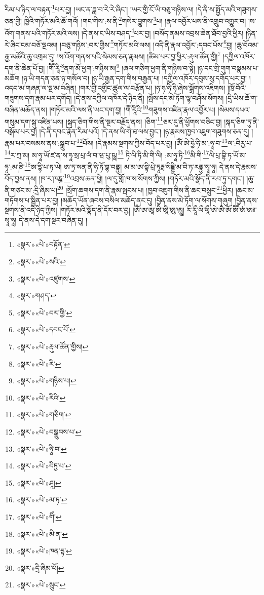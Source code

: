 རིམ་པ་ཉིད་ལ་བརྟན་\footnote{«སྣར་»«པེ་»བརྟོན་}པར་བྱ། །ཡང་ན་ཟླ་བ་རེ་རེ་ཞིང་། །ཡར་གྱི་ངོ་ཡི་བཅུ་གཉིས་ལ། །དེ་ནི་ས་སྤྱོད་མའི་གཟུགས་ཅན་གྱི། ཁྱིའི་གཏོར་མའི་ཆོ་གའོ། །གང་གིས་:ས་ནི་\footnote{«སྣར་»«པེ་»སའི་}གསེར་བྱུགས་\footnote{«སྣར་»«པེ་»འཛུགས་}པ། །རྣལ་འབྱོར་པས་ནི་འགྲུབ་འགྱུར་བ། །ས་འོག་གནས་པའི་གཏོར་མའི་ལས། །དེ་ནས་ང་ཡིས་བཤད་\footnote{«སྣར་»གཤད་}པར་བྱ། །བསོད་ནམས་འབྲས་ཆེན་ཐོབ་བྱའི་ཕྱིར། །ཉིན་རེ་ཞིང་ངམ་བཅོ་ལྔའམ། །བཅུ་གཉིས་:བར་གྱིས་\footnote{«སྣར་»«པེ་»བར་གྱི་}གཏོར་མའི་ལས། །འདི་ནི་རྣལ་འབྱོར་:དབང་པོས་\footnote{«སྣར་»«པེ་»དབང་པོ་}བྱ། །ཆུ་བོའམ་རྒྱ་མཚོའི་ཆུ་འགྲམ་དུ། །ས་འོག་གནས་པའི་སེམས་ཅན་རྣམས། །ཚིམ་པར་བྱ་ཕྱིར་:རྡུལ་ཚོན་གྱི།\footnote{«སྣར་»«པེ་»རྡུལ་ཚོན་གྱིས།} །དཀྱིལ་འཁོར་དག་ནི་ཆེན་པོ་བྱ། །གཽ་རཱི་\footnote{«སྣར་»«པེ་»རི་}ནག་མོ་ཕྱག་:གཉིས་མ།\footnote{«སྣར་»«པེ་»གཉིས་པ།} །ཞལ་གཅིག་ཕྱག་ནི་གཉིས་བ་སྟེ། །ཉ་དང་གྲི་གུག་བསྣམས་པ་མཆོག །ཉ་ཡི་གདན་ཅན་ཉ་གསོལ་བ། །ཉ་ཡི་རྒྱན་དག་གིས་བརྒྱན་པ། །དཀྱིལ་འཁོར་དབུས་སུ་དགོད་པར་བྱ། །འདབ་མ་གཞན་ལ་སྔ་མ་བཞིན། །གར་གྱི་འགྱིང་ཚུལ་ལ་བརྩོན་པ། །ཧ་ཧ་ཧི་ཧི་ཞེས་སྒྲོགས་འཇིགས། །ཁྲོ་བོའི་གཟུགས་དག་རྣམ་པར་དགོད། །དེ་ནས་དཀྱིལ་འཁོར་དེ་ཉིད་ནི། །སྤོས་དང་མེ་ཏོག་ལྷ་བཤོས་སོགས། །དྲི་ཡིས་ཆོ་ག་བཞིན་མཆོད་ནས། །གཏོར་མའི་ལས་ནི་ཡང་དག་བྱ། །གཽ་རཱིའི་\footnote{«སྣར་»«པེ་»རིའི་}གཟུགས་འཛིན་རྣལ་འབྱོར་པ། །སེམས་དཔའ་གསུམ་དག་སྐུ་འཛིན་པས། །སྐད་ཅིག་གིས་ནི་སྔར་བརྗོད་ནས། །ཅིག་\footnote{«སྣར་»«པེ་»གཅིག་}ཅར་དུ་ནི་ཕྱོགས་བཅིང་བྱ། །སྐད་ཅིག་ཏུ་ནི་བསྒོམ་པར་བྱ། །དེ་ནི་དབང་རྣོན་རིམ་པའོ། །དེ་ནས་ཡི་གེ་ཐ་ལས་བྱུང་། །ཉ་རྣམས་ཁྱབ་འཇུག་གཟུགས་ཅན་དུ། །རྣམ་པར་བསམས་ནས་:སྒྲུབ་པ་\footnote{«སྣར་»«པེ་»བསྒྲུབས་པ་}པོས། །དེ་རྣམས་སྔགས་ཀྱིས་བོད་པར་བྱ། །ཨོཾ་ཨེ་ཧྱེ་ཧི་མ་:ཧཱ་བ་\footnote{«སྣར་»«པེ་»ཧཱི་བ་}ལ་:བིརྱ་པ་\footnote{«སྣར་»«པེ་»བིཏྱ་པ་}ར་ཀྲ་མ། མ་ཧཱ་ཡོ་ཛ་ན་ས་ཧཱ་སྲ་པྲ་ལཾ་བ་ཝ་པུ་ཥཱ།\footnote{«སྣར་»«པེ་»ཤཱ།} ཏི་ལི་ཏི་མི་གི་ལི། :མ་ཧཱ་ཏི་\footnote{«སྣར་»«པེ་»མ་ཏ་}མི་གི་\footnote{«སྣར་»«པེ་»གིཾ་}ལི་པྲ་བྷི་ཏ་ཡོ་མ་ཧཱ་:མ་ཎི་\footnote{«སྣར་»«པེ་»མི་ན་}ཨ་དྷི་པ་ཏ་ཡེ། ཨ་ཏྲ་སན་ནི་ཧི་ཏོ་བྷ་བནྟུ། མ་མ་ཨ་བྷི་པྲེ་ཏཱརྠ་སིདྡྷི་མ་བི་ཏ་རནྟུ་སྭཱ་ཧཱ། དེ་ནས་དེ་རྣམས་བོད་བྱས་ནས། །ཁ་ར་ཁཎྜ་\footnote{«སྣར་»«པེ་»ཁན་དྷ་}འབྲས་ཆན་ཕྱེ། །ལ་དུ་གློ་ཁ་ས་སོགས་ཀྱིས། །གཏོར་མའི་སྣོད་ནི་རབ་ཏུ་དགང་། །ཆུ་ནི་གཙང་མ་:དྲི་ཞིམ་པ།\footnote{«སྣར་»དྲི་ཞིམ་པོ།} །སྲོག་ཆགས་དག་ནི་རྣམ་སྤངས་པ། །ཁྱབ་འཇུག་གིས་ནི་ཆང་བསྲུང་\footnote{«སྣར་»«པེ་»སྲུང་}ཕྱིར། །ཆང་མ་གཏོགས་པ་སྦྱིན་པར་བྱ། །མཆོད་ཡོན་ཞབས་བསིལ་མཆོད་ནང་དུ། །བྱིན་ནས་མེ་ཏོག་ལ་སོགས་གཞུག །བྱིན་ནས་སྔགས་ནི་འདི་ཉིད་ཀྱིས། །གཏོར་མའི་སྣོད་ནི་དོར་བར་བྱ། །ཨོཾ་ཨ་ཨཱ་ཨི་ཨཱི་ཨུ་ཨཱུ། རྀ་རཱྀ་ལྀ་ལཱྀ་ཨེ་ཨཻ་ཨོ་ཨཽ་ཨཾ་ཨཿ་སྭཱ་ཧཱ། དེ་ནས་དེ་དག་སྔར་བཞིན་དུ། །
